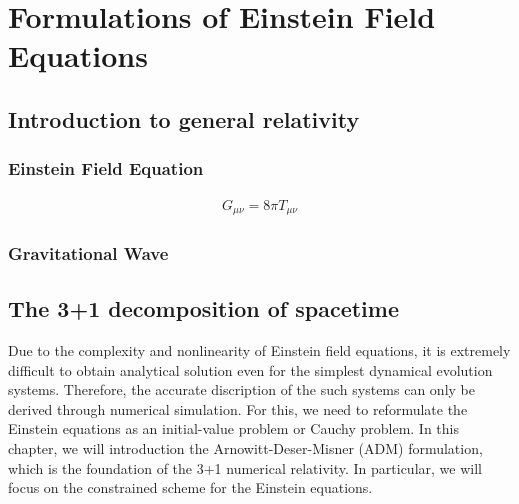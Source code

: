 
\chapter{Formulations of Einstein Field Equations}  %

\ifpdf
    \graphicspath{{Chapter1/Figs/PDF/}{Chapter1/Figs/}}
\else
    \graphicspath{{Chapter1/Figs/}}
\fi


\section{Introduction to general relativity} %
\label{section1.1}

\subsection{Einstein Field Equation} %
\label{section1.1.1}

\begin{align} \label{eq:Einstein_eq}
    G_{\mu\nu} = 8 \pi T_{\mu\nu}
\end{align}


\subsection{Gravitational Wave} %
\label{section1.1.3}

\section{The 3+1 decomposition of spacetime} %
\label{section1.2}

Due to the complexity and nonlinearity of Einstein field equations, it is extremely difficult to obtain analytical solution even for the simplest dynamical evolution systems.
Therefore, the accurate discription of the such systems can only be derived through numerical simulation.
For this, we need to reformulate the Einstein equations as an initial-value problem or Cauchy problem.
In this chapter, we will introduction the Arnowitt-Deser-Misner (ADM) formulation, which is the foundation of the 3+1 numerical relativity.
In particular, we will focus on the constrained scheme for the Einstein equations.

